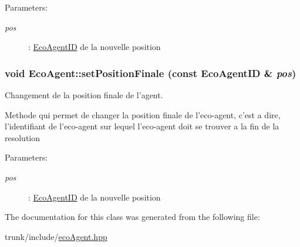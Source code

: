 \begin{Desc}
\item[Parameters:]
\begin{description}
\item[{\em pos}]: \hyperlink{classEcoAgentID}{EcoAgentID} de la nouvelle position \end{description}
\end{Desc}
\hypertarget{classEcoAgent_a0ffbb1fdb23fb5d8ad188e8f16d8c50}{
\subsubsection[{setPositionFinale}]{\setlength{\rightskip}{0pt plus 5cm}void EcoAgent::setPositionFinale (const {\bf EcoAgentID} \& {\em pos})}}
\label{classEcoAgent_a0ffbb1fdb23fb5d8ad188e8f16d8c50}


Changement de la position finale de l'agent. 

Methode qui permet de changer la position finale de l'eco-agent, c'est a dire, l'identifiant de l'eco-agent sur lequel l'eco-agent doit se trouver a la fin de la resolution

\begin{Desc}
\item[Parameters:]
\begin{description}
\item[{\em pos}]: \hyperlink{classEcoAgentID}{EcoAgentID} de la nouvelle position \end{description}
\end{Desc}


The documentation for this class was generated from the following file:\begin{CompactItemize}
\item 
trunk/include/\hyperlink{ecoAgent_8hpp}{ecoAgent.hpp}\end{CompactItemize}
